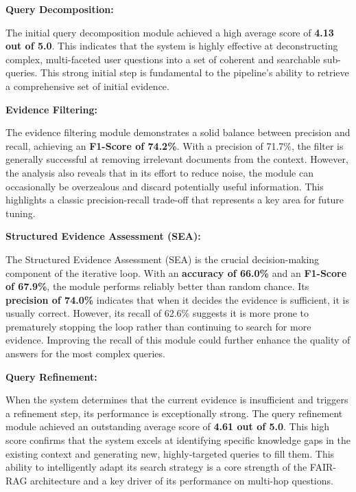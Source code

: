 \documentclass[11pt]{article}
\begin{document}
\textbf{Query Decomposition:}

The initial query decomposition module achieved a high average score of \textbf{4.13 out of 5.0}. This indicates that the system is highly effective at deconstructing complex, multi-faceted user questions into a set of coherent and searchable sub-queries. This strong initial step is fundamental to the pipeline's ability to retrieve a comprehensive set of initial evidence.

\textbf{Evidence Filtering:}

The evidence filtering module demonstrates a solid balance between precision and recall, achieving an \textbf{F1-Score of 74.2\%}. With a precision of 71.7\%, the filter is generally successful at removing irrelevant documents from the context. However, the analysis also reveals that in its effort to reduce noise, the module can occasionally be overzealous and discard potentially useful information. This highlights a classic precision-recall trade-off that represents a key area for future tuning.

\textbf{Structured Evidence Assessment (SEA):}

The Structured Evidence Assessment (SEA) is the crucial decision-making component of the iterative loop. With an \textbf{accuracy of 66.0\%} and an \textbf{F1-Score of 67.9\%}, the module performs reliably better than random chance. Its \textbf{precision of 74.0\%} indicates that when it decides the evidence is sufficient, it is usually correct. However, its recall of 62.6\% suggests it is more prone to prematurely stopping the loop rather than continuing to search for more evidence. Improving the recall of this module could further enhance the quality of answers for the most complex queries.

\textbf{Query Refinement:}

When the system determines that the current evidence is insufficient and triggers a refinement step, its performance is exceptionally strong. The query refinement module achieved an outstanding average score of \textbf{4.61 out of 5.0}. This high score confirms that the system excels at identifying specific knowledge gaps in the existing context and generating new, highly-targeted queries to fill them. This ability to intelligently adapt its search strategy is a core strength of the FAIR-RAG architecture and a key driver of its performance on multi-hop questions.
\end{document}
